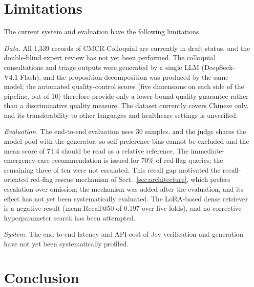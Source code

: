 
\section{Limitations}\label{sec:limits}

The current system and evaluation have the following limitations.

\textit{Data.} All 1{,}339 records of CMCR-Colloquial are currently in draft
status, and the double-blind expert review has not yet been performed. The
colloquial consultations and triage outputs were generated by a single LLM
(DeepSeek-V4.1-Flash), and the proposition decomposition was produced by the
same model; the automated quality-control scores (five dimensions on each side
of the pipeline, out of 10) therefore provide only a lower-bound quality
guarantee rather than a discriminative quality measure. The dataset currently
covers Chinese only, and its transferability to other languages and healthcare
settings is unverified.

\textit{Evaluation.} The end-to-end evaluation uses 30 samples, and the judge
shares the model pool with the generator, so self-preference bias cannot be
excluded and the mean score of 71.4 should be read as a relative reference.
The immediate-emergency-care recommendation is issued for 70\% of red-flag
queries; the remaining three of ten were not escalated. This recall gap
motivated the recall-oriented red-flag rescue mechanism of
Sect.~\ref{sec:architecture}, which prefers escalation over omission; the
mechanism was added after the evaluation, and its effect has not yet been
systematically evaluated. The LoRA-based dense retriever is a negative result
(mean Recall@50 of 0.197 over five folds), and no corrective hyperparameter
search has been attempted.

\textit{System.} The end-to-end latency and API cost of Jev verification and
generation have not yet been systematically profiled.

\section{Conclusion}\label{sec:conc}

